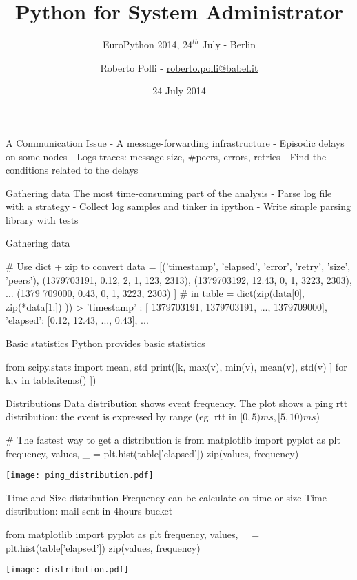 \documentclass{beamer}[10]
\title{Python for System Administrator}
\subtitle{EuroPython 2014, $24^{th}$ July - Berlin}
\author{Roberto Polli - \href{mailto:roberto.polli@babel.it}{roberto.polli@babel.it}}
\date{24 July 2014}
\institute{Babel Srl P.zza S. Benedetto da Norcia, 33\\ 
    00040, Pomezia (RM) - www.babel.it}
\begin{document}
\frame{\titlepage 
\vspace{-0.5cm}
}



%



\begin{pyframe}{A Communication Issue}
- A message-forwarding infrastructure
- Episodic delays on some nodes
- Logs traces: message size, #peers, errors, retries
- Find the conditions related to the delays
\end{pyframe}


\begin{pyframe}{Gathering data}
The most time-consuming part of the analysis
- Parse log file with a strategy
- Collect log samples and tinker in ipython
- Write simple parsing library with tests
\end{pyframe}


\begin{pyframe}{Gathering data}
\begin{pycode}
# Use dict + zip to convert
data = [('timestamp', 'elapsed', 'error', 'retry', 'size', 'peers'),
(1379703191, 0.12, 2, 1, 123, 2313),
(1379703192, 12.43, 0, 1, 3223, 2303),
...
(1379 709000, 0.43, 0, 1, 3223, 2303)
]
# in
table = dict(zip(data[0],  zip(*data[1:]) ))
> { 'timestamp' : [ 1379703191, 1379703191, ..., 1379709000],
'elapsed': [0.12, 12.43, ..., 0.43],
... }

\end{pycode}
\end{pyframe}

\begin{pyframe}{Basic statistics}
Python provides basic statistics
\begin{pycode}
from scipy.stats import mean, std
print([k, max(v), min(v), mean(v), std(v) ] 
    for k,v in table.items() ])
\end{pycode}
\end{pyframe}


\begin{pyframe}{Distributions}
Data distribution shows event frequency. 
The plot shows a ping rtt distribution: the event is 
 expressed by range (eg. rtt in $[0,5)ms,[5,10)ms$)
\begin{pycode}
# The fastest way to get a distribution is
from matplotlib import pyplot as plt
frequency, values, _  = plt.hist(table['elapsed'])
zip(values, frequency)
\end{pycode}
\texttt{[image: ping\_distribution.pdf]}
\end{pyframe}


\begin{pyframe}{Time and Size distribution}
Frequency can be calculate on time or size
Time distribution: mail sent in 4hours bucket
\begin{pycode}
from matplotlib import pyplot as plt
frequency, values, _  = plt.hist(table['elapsed'])
zip(values, frequency)
\end{pycode}
\texttt{[image: distribution.pdf]}
\end{pyframe}
\end{document}
